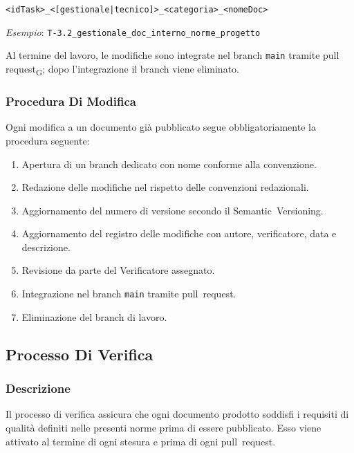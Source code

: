 \begin{center}
  \texttt{<idTask>\_<[gestionale|tecnico]>\_<categoria>\_<nomeDoc>}
\end{center}
 
\textit{Esempio}: \texttt{T-3.2\_gestionale\_doc\_interno\_norme\_progetto}
 
Al termine del lavoro, le modifiche sono integrate nel branch \texttt{main} tramite
pull request\textsubscript{G}; dopo l'integrazione il branch viene eliminato.
 
\subsubsection{Procedura Di Modifica}
 
Ogni modifica a un documento già pubblicato segue obbligatoriamente la procedura
seguente:
 
\begin{enumerate}
  \item Apertura di un branch dedicato con nome conforme alla convenzione.
  \item Redazione delle modifiche nel rispetto delle convenzioni redazionali.
  \item Aggiornamento del numero di versione secondo il
        Semantic~Versioning.
  \item Aggiornamento del registro delle modifiche con autore, verificatore,
        data e descrizione.
  \item Revisione da parte del Verificatore assegnato.
  \item Integrazione nel branch \texttt{main} tramite pull~request.
  \item Eliminazione del branch di lavoro.
\end{enumerate}
 
\subsection{Processo Di Verifica}
\label{sec:verifica}
 
\subsubsection{Descrizione}
 
Il processo di verifica assicura che ogni documento prodotto soddisfi i requisiti
di qualità definiti nelle presenti norme prima di essere pubblicato. Esso viene
attivato al termine di ogni stesura e prima di ogni pull~request.
 
